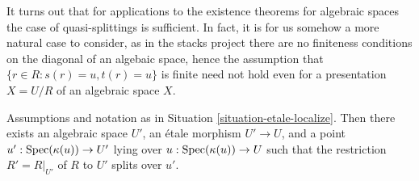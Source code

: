 \noindent
It turns out that for applications to the existence theorems for algebraic
spaces the case of quasi-splittings is sufficient. In fact, it is for us
somehow a more natural case to consider, as in the stacks project there
are no finiteness conditions on the diagonal of an algebaic space, hence
the assumption that $\{r \in R : s(r) = u, t(r) = u\}$ is finite need
not hold even for a presentation $X = U/R$ of an algebraic space $X$.

\begin{lemma}
\label{lemma-splitting-general}
Assumptions and notation as in
Situation \ref{situation-etale-localize}.
Then there exists an algebraic space $U'$, an \'etale morphism
$U' \to U$, and a point $u' : \mathop{\rm Spec}(\kappa(u)) \to U'$
lying over $u : \mathop{\rm Spec}(\kappa(u)) \to U$
such that the restriction $R' = R|_{U'}$ of $R$ to $U'$
splits over $u'$.
\end{lemma}

